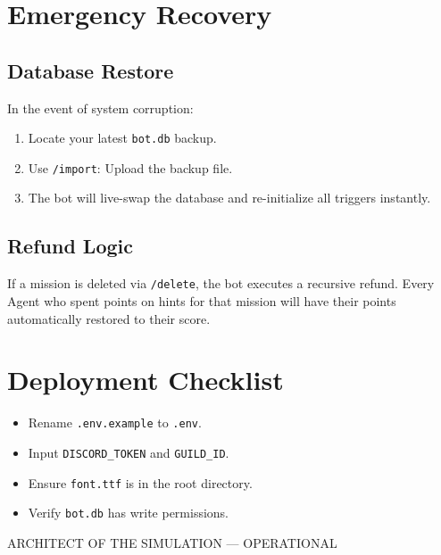 \documentclass[12pt,a4paper]{article}
\begin{document}
\section{Emergency Recovery}
\subsection{Database Restore}
In the event of system corruption:
\begin{enumerate}
    \item Locate your latest \texttt{bot.db} backup.
    \item Use \texttt{/import}: Upload the backup file.
    \item The bot will live-swap the database and re-initialize all triggers instantly.
\end{enumerate}

\subsection{Refund Logic}
If a mission is deleted via \texttt{/delete}, the bot executes a recursive refund. Every Agent who spent points on hints for that mission will have their points automatically restored to their score.

\section{Deployment Checklist}
\begin{itemize}
    \item[$\square$] Rename \texttt{.env.example} to \texttt{.env}.
    \item[$\square$] Input \texttt{DISCORD\_TOKEN} and \texttt{GUILD\_ID}.
    \item[$\square$] Ensure \texttt{font.ttf} is in the root directory.
    \item[$\square$] Verify \texttt{bot.db} has write permissions.
\end{itemize}

\vfill
\centerline{\color{cybercyan} ARCHITECT OF THE SIMULATION --- OPERATIONAL}
\end{document}
